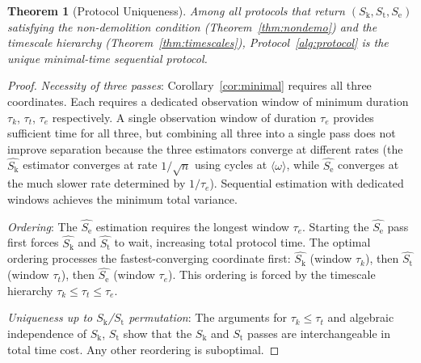 \documentclass[11pt,twocolumn,a4paper]{article}
\newtheorem{theorem}{Theorem}[section]
\theoremstyle{definition}
\theoremstyle{remark}
\newcommand{\Sk}{S_{\mathrm{k}}}
\newcommand{\St}{S_{\mathrm{t}}}
\newcommand{\Se}{S_{\mathrm{e}}}
\begin{document}
\begin{theorem}[Protocol Uniqueness]
\label{thm:protocol}
Among all protocols that return $(\Sk, \St, \Se)$ satisfying the
non-demolition condition (Theorem~\ref{thm:nondemo}) and the timescale
hierarchy (Theorem~\ref{thm:timescales}), Protocol~\ref{alg:protocol}
is the unique minimal-time sequential protocol.
\end{theorem}

\begin{proof}
\textit{Necessity of three passes}: Corollary~\ref{cor:minimal} requires
all three coordinates. Each requires a dedicated observation window of minimum
duration $\tau_k$, $\tau_t$, $\tau_e$ respectively. A single observation window
of duration $\tau_e$ provides sufficient time for all three, but combining
all three into a single pass does not improve separation because the three
estimators converge at different rates (the $\hat{\Sk}$ estimator converges
at rate $1/\sqrt{n}$ using cycles at $\langle\omega\rangle$, while $\hat{\Se}$
converges at the much slower rate determined by $1/\tau_e$). Sequential
estimation with dedicated windows achieves the minimum total variance.

\textit{Ordering}: The $\hat{\Se}$ estimation requires the longest window
$\tau_e$. Starting the $\hat{\Se}$ pass first forces $\hat{\Sk}$ and $\hat{\St}$
to wait, increasing total protocol time. The optimal ordering processes
the fastest-converging coordinate first: $\hat{\Sk}$ (window $\tau_k$),
then $\hat{\St}$ (window $\tau_t$), then $\hat{\Se}$ (window $\tau_e$).
This ordering is forced by the timescale hierarchy $\tau_k \leq \tau_t \leq \tau_e$.

\textit{Uniqueness up to $\Sk$/$\St$ permutation}: The arguments for $\tau_k \leq \tau_t$
and algebraic independence of $\Sk$, $\St$ show that the $\Sk$ and $\St$
passes are interchangeable in total time cost. Any other reordering is
suboptimal.
\end{proof}
\end{document}
